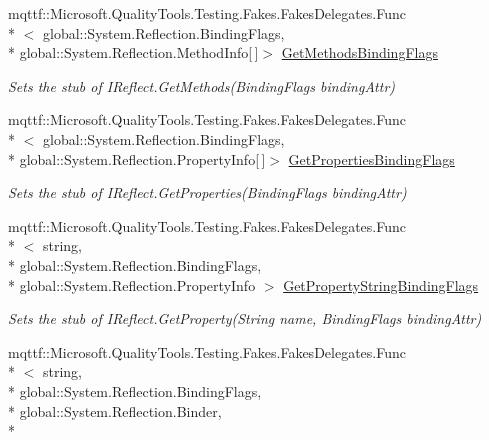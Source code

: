 \begin{DoxyCompactItemize}
mqttf\-::\-Microsoft.\-Quality\-Tools.\-Testing.\-Fakes.\-Fakes\-Delegates.\-Func\\*
$<$ global\-::\-System.\-Reflection.\-Binding\-Flags, \\*
global\-::\-System.\-Reflection.\-Method\-Info\mbox{[}$\,$\mbox{]}$>$ \hyperlink{class_system_1_1_reflection_1_1_fakes_1_1_stub_i_reflect_aaf60a0fb0a82519e5b849efef62dc574}{Get\-Methods\-Binding\-Flags}
\begin{DoxyCompactList}\small\item\em Sets the stub of I\-Reflect.\-Get\-Methods(\-Binding\-Flags binding\-Attr)\end{DoxyCompactList}\item 
mqttf\-::\-Microsoft.\-Quality\-Tools.\-Testing.\-Fakes.\-Fakes\-Delegates.\-Func\\*
$<$ global\-::\-System.\-Reflection.\-Binding\-Flags, \\*
global\-::\-System.\-Reflection.\-Property\-Info\mbox{[}$\,$\mbox{]}$>$ \hyperlink{class_system_1_1_reflection_1_1_fakes_1_1_stub_i_reflect_ace8c1837feeaa3fa05c79c4b48091e82}{Get\-Properties\-Binding\-Flags}
\begin{DoxyCompactList}\small\item\em Sets the stub of I\-Reflect.\-Get\-Properties(\-Binding\-Flags binding\-Attr)\end{DoxyCompactList}\item 
mqttf\-::\-Microsoft.\-Quality\-Tools.\-Testing.\-Fakes.\-Fakes\-Delegates.\-Func\\*
$<$ string, \\*
global\-::\-System.\-Reflection.\-Binding\-Flags, \\*
global\-::\-System.\-Reflection.\-Property\-Info $>$ \hyperlink{class_system_1_1_reflection_1_1_fakes_1_1_stub_i_reflect_a2853f533fb9dfc54eb5db43c9e7e2b47}{Get\-Property\-String\-Binding\-Flags}
\begin{DoxyCompactList}\small\item\em Sets the stub of I\-Reflect.\-Get\-Property(\-String name, Binding\-Flags binding\-Attr)\end{DoxyCompactList}\item 
mqttf\-::\-Microsoft.\-Quality\-Tools.\-Testing.\-Fakes.\-Fakes\-Delegates.\-Func\\*
$<$ string, \\*
global\-::\-System.\-Reflection.\-Binding\-Flags, \\*
global\-::\-System.\-Reflection.\-Binder, \\*

\end{DoxyCompactItemize}
